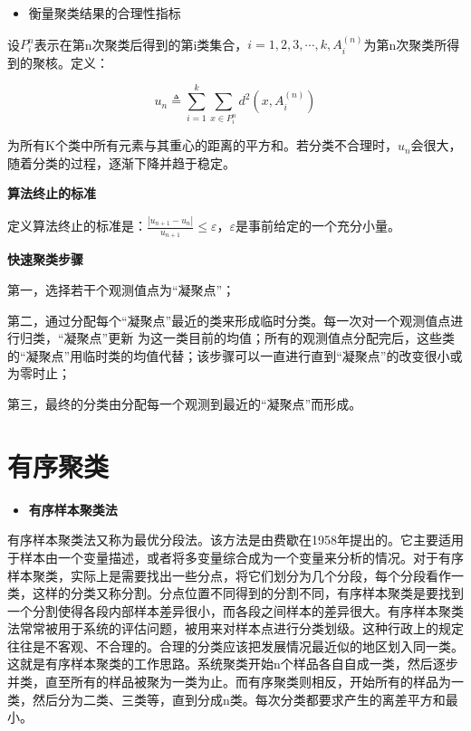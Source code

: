 \documentclass[]{ctexbook}
\providecommand{\tightlist}{%
  \setlength{\itemsep}{0pt}\setlength{\parskip}{0pt}}
\begin{document}
\begin{itemize}
\tightlist
\item
  衡量聚类结果的合理性指标
\end{itemize}

设\(P_i^n\)表示在第n次聚类后得到的第i类集合，\(i=1,2,3,\cdots,k,A_i^{(n)}\)为第n次聚类所得到的聚核。定义：

\[u_n\triangleq \sum_{i=1}^k\sum_{x\in P_i^n}d^2(x,A_i^{(n)})\]

为所有K个类中所有元素与其重心的距离的平方和。若分类不合理时，\(u_n\)会很大，随着分类的过程，逐渐下降并趋于稳定。

\textbf{算法终止的标准}

定义算法终止的标准是：\(\frac{|u_{n+1}-u_n|}{u_{n+1}}\le \varepsilon\)，\(\varepsilon\)是事前给定的一个充分小量。

\textbf{快速聚类步骤}

第一，选择若干个观测值点为``凝聚点''；

第二，通过分配每个``凝聚点''最近的类来形成临时分类。每一次对一个观测值点进行归类，``凝聚点''更新
为这一类目前的均值；所有的观测值点分配完后，这些类的``凝聚点''用临时类的均值代替；该步骤可以一直进行直到``凝聚点''的改变很小或为零时止；

第三，最终的分类由分配每一个观测到最近的``凝聚点''而形成。

\hypertarget{ux6709ux5e8fux805aux7c7b}{%
\section{有序聚类}\label{ux6709ux5e8fux805aux7c7b}}

\begin{itemize}
\tightlist
\item
  \textbf{有序样本聚类法}
\end{itemize}

有序样本聚类法又称为最优分段法。该方法是由费歇在1958年提出的。它主要适用于样本由一个变量描述，或者将多变量综合成为一个变量来分析的情况。对于有序样本聚类，实际上是需要找出一些分点，将它们划分为几个分段，每个分段看作一类，这样的分类又称分割。分点位置不同得到的分割不同，有序样本聚类是要找到一个分割使得各段内部样本差异很小，而各段之间样本的差异很大。有序样本聚类法常常被用于系统的评估问题，被用来对样本点进行分类划级。这种行政上的规定往往是不客观、不合理的。合理的分类应该把发展情况最近似的地区划入同一类。这就是有序样本聚类的工作思路。系统聚类开始n个样品各自自成一类，然后逐步并类，直至所有的样品被聚为一类为止。而有序聚类则相反，开始所有的样品为一类，然后分为二类、三类等，直到分成n类。每次分类都要求产生的离差平方和最小。
\end{document}
